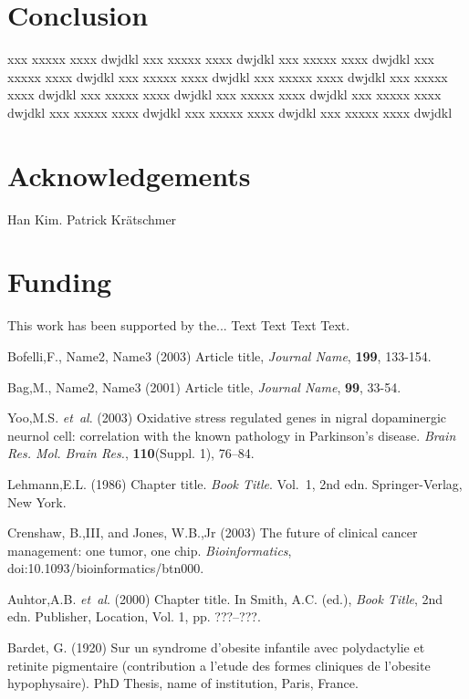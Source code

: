 \documentclass{bioinfo}
\begin{document}
\section{Conclusion}

xxx xxxxx xxxx dwjdkl xxx xxxxx xxxx dwjdkl xxx xxxxx xxxx dwjdkl xxx xxxxx xxxx dwjdkl xxx xxxxx xxxx dwjdkl 
xxx xxxxx xxxx dwjdkl xxx xxxxx xxxx dwjdkl xxx xxxxx xxxx dwjdkl xxx xxxxx xxxx dwjdkl xxx xxxxx xxxx dwjdkl 
xxx xxxxx xxxx dwjdkl xxx xxxxx xxxx dwjdkl xxx xxxxx xxxx dwjdkl 

\section*{Acknowledgements}

Han Kim. Patrick Kr{\"a}tschmer

\section*{Funding}

This work has been supported by the... Text Text  Text Text.\vspace*{-12pt}

%
%
%
%
%
%
%
%
%


\begin{thebibliography}{}

Bofelli,F., Name2, Name3 (2003) Article title, {\it Journal Name}, {\bf 199}, 133-154.

Bag,M., Name2, Name3 (2001) Article title, {\it Journal Name}, {\bf 99}, 33-54.

Yoo,M.S. \textit{et~al}. (2003) Oxidative stress regulated genes
in nigral dopaminergic neurnol cell: correlation with the known
pathology in Parkinson's disease. \textit{Brain Res. Mol. Brain
Res.}, \textbf{110}(Suppl. 1), 76--84.

Lehmann,E.L. (1986) Chapter title. \textit{Book Title}. Vol.~1, 2nd edn. Springer-Verlag, New York.

Crenshaw, B.,III, and Jones, W.B.,Jr (2003) The future of clinical
cancer management: one tumor, one chip. \textit{Bioinformatics},
doi:10.1093/bioinformatics/btn000.

Auhtor,A.B. \textit{et~al}. (2000) Chapter title. In Smith, A.C.
(ed.), \textit{Book Title}, 2nd edn. Publisher, Location, Vol. 1, pp.
???--???.

Bardet, G. (1920) Sur un syndrome d'obesite infantile avec
polydactylie et retinite pigmentaire (contribution a l'etude des
formes cliniques de l'obesite hypophysaire). PhD Thesis, name of
institution, Paris, France.

\end{thebibliography}
\end{document}
